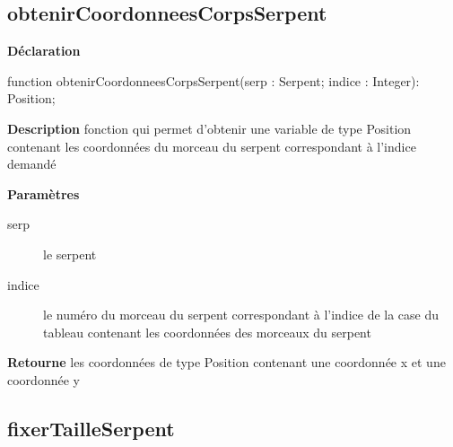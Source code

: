 \documentclass{report}
\newif\ifpdf
\begin{document}
\subsection*{obtenirCoordonneesCorpsSerpent}
\fi
\label{Types-obtenirCoordonneesCorpsSerpent}
\begin{list}{}{
\setlength{\itemindent}{0cm}
\setlength{\listparindent}{0cm}
\setlength{\leftmargin}{\evensidemargin}
\addtolength{\leftmargin}{\tmplength}
\settowidth{\labelsep}{X}
\addtolength{\leftmargin}{\labelsep}
\setlength{\labelwidth}{\tmplength}
}
\item[\textbf{Déclaration}\hfill]
\ifpdf
\begin{flushleft}
\fi
\begin{ttfamily}
function obtenirCoordonneesCorpsSerpent(serp : Serpent; indice : Integer): Position;\end{ttfamily}

\ifpdf
\end{flushleft}
\fi

\par
\item[\textbf{Description}]
fonction qui permet d'obtenir une variable de type Position contenant les coordonnées du morceau du serpent correspondant à l'indice demandé   \par
\item[\textbf{Paramètres}]
\begin{description}
\item[serp] le serpent
\item[indice] le numéro du morceau du serpent correspondant à l'indice de la case du tableau contenant les coordonnées des morceaux du serpent
\end{description}
\item[\textbf{Retourne}]les coordonnées de type Position contenant une coordonnée x et une coordonnée y


\end{list}
\ifpdf
\subsection*{\large{\textbf{fixerTailleSerpent}}\normalsize\hspace{1ex}\hrulefill}
\else
\end{document}
